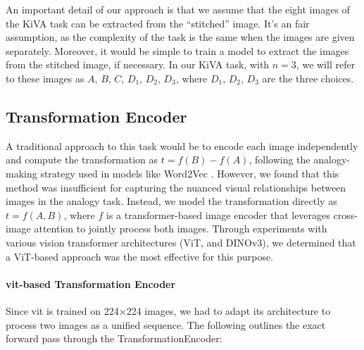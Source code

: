 \documentclass[twocolumn]{article} %
\begin{document}
An important detail of our approach is that we assume that the eight images of the KiVA task can be extracted from the ``stitched'' image. It's an fair assumption, as the complexity of the task is the same when the images are given separately. Moreover, it would be simple to train a model to extract the images from the stitched image, if necessary. In our KiVA task, with $n=3$, we will refer to these images as $A$, $B$, $C$, $D_1$, $D_2$, $D_3$, where $D_1$, $D_2$, $D_3$ are the three choices. 

\subsection{Transformation Encoder}

A traditional approach to this task would be to encode each image independently and compute the transformation as \(t = f(B) - f(A)\), following the analogy-making strategy used in models like Word2Vec \cite{mikolov2013efficient}. However, we found that this method was insufficient for capturing the nuanced visual relationships between images in the analogy task. Instead, we model the transformation directly as \(t = f(A, B)\), where $f$ is a transformer-based image encoder that leverages cross-image attention to jointly process both images. Through experiments with various vision transformer architectures (ViT, and DINOv3), we determined that a ViT-based approach was the most effective for this purpose.

\paragraph{\gls{vit}-based Transformation Encoder}
Since \gls{vit} is trained on 224$\times$224 images, we had to adapt its architecture to process two images as a unified sequence. The following outlines the exact forward pass through the TransformationEncoder:
\end{document}
